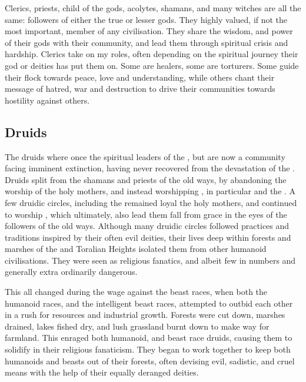 Clerics, priests, child of the gods, acolytes, shamans, and many witches are
all the same: followers of either the true or lesser gods. They highly valued,
if not the most important, member of any civilisation. They share the wisdom,
and power of their gods with their community, and lead them through spiritual
crisis and hardship. Clerics take on my roles, often depending on the
spiritual journey their god or deities has put them on. Some are healers, some
are torturers. Some guide their flock towards peace, love and understanding,
while others chant their message of hatred, war and destruction to drive their
communities towards hostility against others.

\subsection{Druids}
\label{sec:Druids}

The druids where once the spiritual leaders of the , but
are now a community facing imminent extinction, having never recovered from
the devastation of the . Druids split from the
shamans and priests of the old ways, by abandoning the worship of the holy
mothers, and instead worshipping , in particular
 and the . A few druidic circles,
including the  remained loyal the holy mothers, and
continued to worship , which ultimately, also lead them
fall from grace in the eyes of the followers of the old ways. Although many
druidic circles followed practices and traditions inspired by their often evil
deities, their lives deep within forests and marshes of the
 and Toralian Heights isolated them from other humanoid
civilisations. They were seen as religious fanatics, and albeit few in numbers
and generally extra ordinarily dangerous.

This all changed during the wage against the beast races, when both the
humanoid races, and the intelligent beast races, attempted to outbid each
other in a rush for resources and industrial growth. Forests were cut down,
marshes drained, lakes fished dry, and lush grassland burnt down to make way
for farmland. This enraged both humanoid, and beast race druids, causing them
to solidify in their religious fanaticism. They began to work together to keep
both humanoids and beasts out of their forests, often devising evil, sadistic,
and cruel means with the help of their equally deranged deities.

